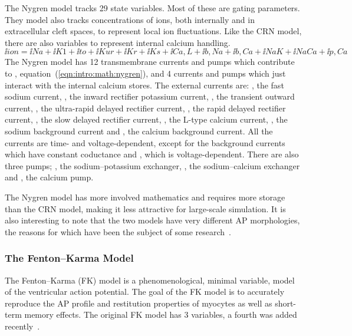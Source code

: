 The Nygren model tracks 29 state variables.
Most of these are gating parameters.
They model also tracks concentrations of ions, both internally and in
extracellular cleft spaces, to represent local ion fluctuations.
Like the CRN model, there are also variables to represent internal calcium
handling.
\begin{equation}
\label{eqn:intro:math:nygren}
\ii{ion} = \ii{Na} + \ii{K1} + \ii{to} + \ii{Kur} + \ii{Kr} + \ii{Ks} +
\ii{Ca,L} + \ii{b,Na} + \ii{b,Ca} + \ii{NaK} + \ii{NaCa} + \ii{p,Ca}
\end{equation}
The Nygren model has 12 transmembrane currents and pumps which contribute to ,
equation~(\ref{eqn:intro:math:nygren}), and 4 currents and
pumps which just interact with the internal calcium stores.
The external currents are: , the fast sodium current, , the inward
rectifier potassium current, , the transient outward current, , the
ultra-rapid delayed rectifier current, , the rapid delayed rectifier
current, , the slow delayed rectifier current, , the L-type
calcium current, , the sodium background current and , the
calcium background current.
All the currents are time- and voltage-dependent, except for the background
currents which have constant coductance and , which is voltage-dependent.
There are also three pumps; , the sodium--potassium exchanger,
, the sodium--calcium exchanger and , the calcium pump.

The Nygren model has more involved mathematics and requires more storage than
the CRN model, making it less attractive for large-scale simulation.
It is also interesting to note that the two models have very different
AP morphologies, the reasons for which have been the subject of some
research~\cite{Nygren2001,Syed2005,Cherry2008}.

\subsubsection{The Fenton--Karma Model}

The Fenton--Karma (FK) model is a
phenomenological, minimal variable, model of the ventricular action
potential.
The goal of the FK model is to accurately reproduce the AP profile and
restitution properties of myocytes as well as short-term memory effects.
The original FK model has 3 variables, a fourth was added
recently~\cite{Fenton1998,Bueno-Orovio2008}.

